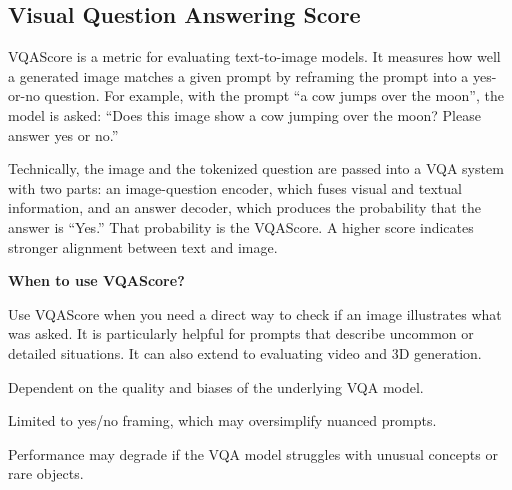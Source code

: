 \subsection{Visual Question Answering Score}


VQAScore is a metric for evaluating text-to-image models. It measures how well a generated image matches a given prompt by reframing the prompt
into a yes-or-no question. For example, with the prompt “a cow jumps over the moon”, the model is asked: “Does this image show a cow jumping over
the moon? Please answer yes or no.”

\begin{center}
\end{center}

Technically, the image and the tokenized question are passed into a VQA system with two parts: an image-question encoder, which fuses visual and
textual information, and an answer decoder, which produces the probability that the answer is “Yes.” That probability is the VQAScore. A higher score
indicates stronger alignment between text and image.

\textbf{When to use VQAScore?}

Use VQAScore when you need a direct way to check if an image illustrates what was asked. It is particularly helpful for prompts that describe uncommon
or detailed situations. It can also extend to evaluating video and 3D generation.

{
\item Dependent on the quality and biases of the underlying VQA model.
\item Limited to yes/no framing, which may oversimplify nuanced prompts.
\item Performance may degrade if the VQA model struggles with unusual concepts or rare objects.
}

